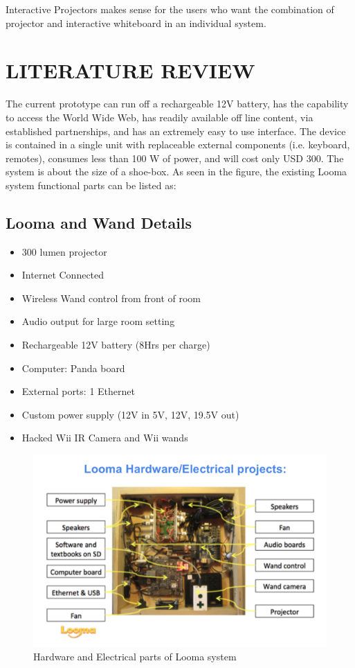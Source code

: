 \documentclass[12pt, a4paper]{article}
\begin{document}
Interactive Projectors makes sense for the
users who want the combination of projector and interactive whiteboard in
an individual system. 

\newpage
\section{LITERATURE REVIEW}
The current prototype can run off a rechargeable 12V battery, has the capability to access the World Wide Web, has readily available off line content, via established partnerships, and has an extremely easy to use interface. The device is contained in a single unit with replaceable external components (i.e. keyboard, remotes), consumes less than 100 W of power, and will cost only USD 300. The system is about the size of a shoe-box. 
As seen in the figure, the existing Looma system functional parts can be listed as:

\subsection{Looma and Wand Details}
\begin{itemize}
\item300 lumen projector
\item Internet Connected 
\item Wireless Wand control from front of room
\item Audio output for large room setting
\item Rechargeable 12V battery (8Hrs per charge)
\item Computer: Panda board
\item External ports: 1 Ethernet
\item Custom power supply (12V in 5V, 12V, 19.5V out)
\item Hacked Wii IR Camera and Wii wands
\end{itemize}

\begin{figure}[htp]
\centering
\includegraphics[scale=0.22]{looma.png}
\caption{Hardware and Electrical parts of Looma system}
\label{}
\end{figure}
\end{document}
